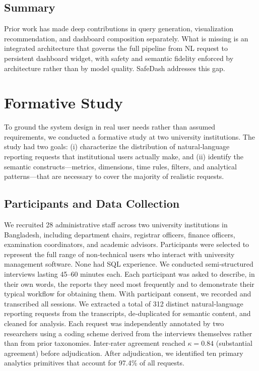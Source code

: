 \documentclass[11pt]{article}
\begin{document}
\subsection{Summary}
Prior work has made deep contributions in query generation, visualization recommendation, and dashboard composition separately. What is missing is an integrated architecture that governs the full pipeline from NL request to persistent dashboard widget, with safety and semantic fidelity enforced by architecture rather than by model quality. SafeDash addresses this gap.

\section{Formative Study\label{sec:formative}}
To ground the system design in real user needs rather than assumed requirements, we conducted a formative study at two university institutions. The study had two goals: (i) characterize the distribution of natural‑language reporting requests that institutional users actually make, and (ii) identify the semantic constructs—metrics, dimensions, time rules, filters, and analytical patterns—that are necessary to cover the majority of realistic requests.

\subsection{Participants and Data Collection}
We recruited 28 administrative staff across two university institutions in Bangladesh, including department chairs, registrar officers, finance officers, examination coordinators, and academic advisors. Participants were selected to represent the full range of non‑technical users who interact with university management software. None had SQL experience. We conducted semi‑structured interviews lasting 45–60 minutes each. Each participant was asked to describe, in their own words, the reports they need most frequently and to demonstrate their typical workflow for obtaining them. With participant consent, we recorded and transcribed all sessions. We extracted a total of 312 distinct natural‑language reporting requests from the transcripts, de‑duplicated for semantic content, and cleaned for analysis. Each request was independently annotated by two researchers using a coding scheme derived from the interviews themselves rather than from prior taxonomies. Inter‑rater agreement reached $\kappa = 0.84$ (substantial agreement) before adjudication. After adjudication, we identified ten primary analytics primitives that account for 97.4\% of all requests.
\end{document}
